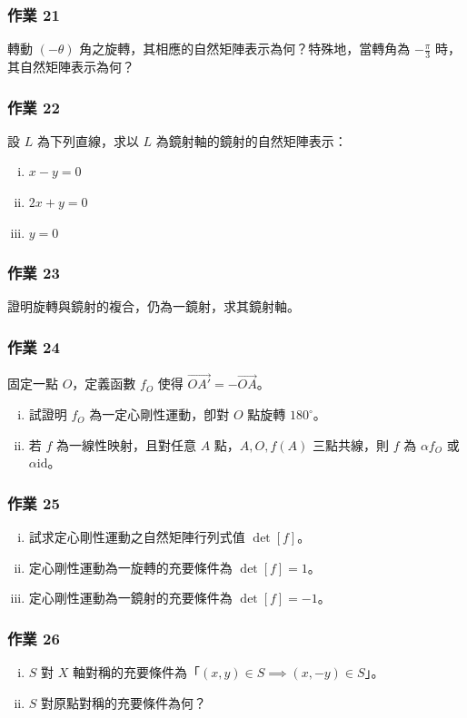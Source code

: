 \subsubsection*{作業 21}
轉動 $(-\theta)$ 角之旋轉，其相應的自然矩陣表示為何？特殊地，當轉角為 $-\frac{\pi}{3}$ 時，其自然矩陣表示為何？

\subsubsection*{作業 22}
設 $L$ 為下列直線，求以 $L$ 為鏡射軸的鏡射的自然矩陣表示：
\begin{enumerate}[(i)]
  \item $x - y = 0$
  \item $2x + y = 0$
  \item $y = 0$
\end{enumerate}

\subsubsection*{作業 23}
證明旋轉與鏡射的複合，仍為一鏡射，求其鏡射軸。

\subsubsection*{作業 24}
固定一點 $O$，定義函數 $f_O$ 使得 $\vec{OA'} = -\vec{OA}$。
\begin{enumerate}[(i)]
  \item 試證明 $f_O$ 為一定心剛性運動，卽對 $O$ 點旋轉 $180^\circ$。
  \item 若 $f$ 為一線性映射，且對任意 $A$ 點，$A, O, f(A)$ 三點共線，則 $f$ 為 $\alpha f_O$ 或 $\alpha \mathrm{id}$。
\end{enumerate}

\subsubsection*{作業 25}
\begin{enumerate}[(i)]
  \item 試求定心剛性運動之自然矩陣行列式值 $\det[f]$。
  \item 定心剛性運動為一旋轉的充要條件為 $\det[f] = 1$。
  \item 定心剛性運動為一鏡射的充要條件為 $\det[f] = -1$。
\end{enumerate}

\subsubsection*{作業 26}
\begin{enumerate}[(i)]
  \item $S$ 對 $X$ 軸對稱的充要條件為「$(x, y) \in S \implies (x, -y) \in S$」。
  \item $S$ 對原點對稱的充要條件為何？
\end{enumerate}

